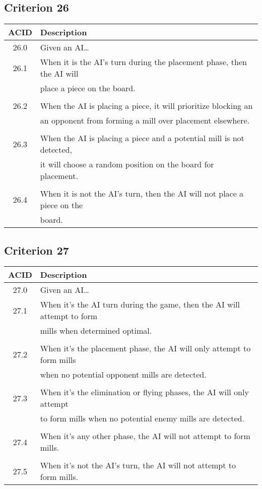 \documentclass[11pt]{article}
\begin{document}
\subsection{Criterion 26}
\label{sec:org3fd669d}
\begin{center}
\begin{tabular}{|c|p{12.0cm}|}
ACID & Description\\
\hline
26.0 & Given an AI\ldots{}\\
\hline
26.1 & When it is the AI's turn during the placement phase, then the AI will\\
 & place a piece on the board.\\
 & \\
26.2 & When the AI is placing a piece, it will prioritize blocking an\\
 & an opponent from forming a mill over placement elsewhere.\\
 & \\
26.3 & When the AI is placing a piece and a potential mill is not detected,\\
 & it will choose a random position on the board for placement.\\
 & \\
26.4 & When it is not the AI's turn, then the AI will not place a piece on the\\
 & board.\\
\end{tabular}
\end{center}

\subsection{Criterion 27}
\label{sec:org2018ffd}
\begin{center}
\begin{tabular}{|c|p{12.0cm}|}
ACID & Description\\
\hline
27.0 & Given an AI\ldots{}\\
\hline
27.1 & When it's the AI turn during the game, then the AI will attempt to form\\
 & mills when determined optimal.\\
 & \\
27.2 & When it's the placement phase, the AI will only attempt to form mills\\
 & when no potential opponent mills are detected.\\
 & \\
27.3 & When it's the elimination or flying phases, the AI will only attempt\\
 & to form mills when no potential enemy mills are detected.\\
 & \\
27.4 & When it's any other phase, the AI will not attempt to form mills.\\
 & \\
27.5 & When it's not the AI's turn, the AI will not attempt to form mills.\\
\end{tabular}
\end{center}
\end{document}
